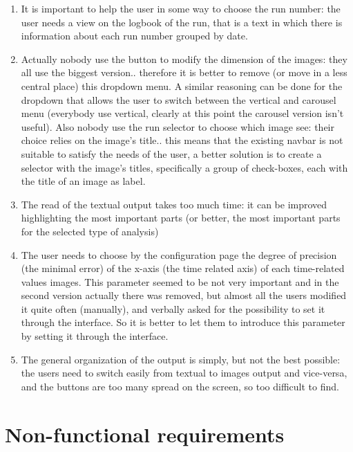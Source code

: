 \begin{enumerate}
\item 
It is important to help the user in some way to choose the run number: the user needs a view on the logbook of the run, that is a text in which there is information about each run number grouped by date.

\item
Actually nobody use the button to modify the dimension of the images: they all use the biggest version.. therefore it is better to remove (or move in a less central place) this dropdown menu. A similar reasoning can be done for the dropdown that allows the user to switch between the vertical and carousel menu (everybody use vertical, clearly at this point the carousel version isn't useful). Also nobody use the run selector to choose which image see: their choice relies on the image's title.. this means that the existing navbar is not suitable to satisfy the needs of the user, a better solution is to create a selector with the image's titles, specifically a group of check-boxes, each with the title of an image as label.  

\item
The read of the textual output takes too much time: it can be improved highlighting the most important parts (or better, the most important parts for the selected type of analysis)

\item
The user needs to choose by the configuration page the degree of precision (the minimal error) of the x-axis (the time related axis) of each time-related values images. This parameter seemed to be not very important and in the second version actually there was removed, but almost all the users modified it quite often (manually), and verbally asked for the possibility to set it through the interface. So it is better to let them to introduce this parameter by setting it through the interface.

\item
The general organization of the output is simply, but not the best possible: the users need to switch easily from textual to images output and vice-versa, and the buttons are too many spread on the screen, so too difficult to find.

\end{enumerate}

\section{Non-functional requirements}

